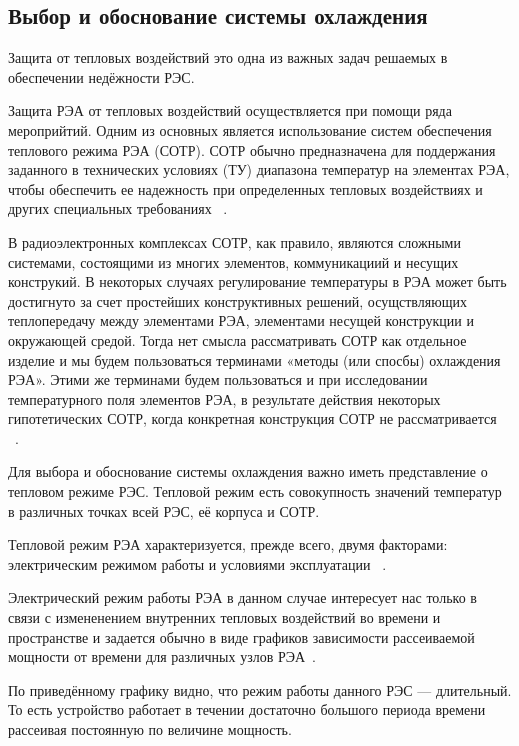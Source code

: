 \subsection{Выбор и обоснование системы охлаждения}

Защита от тепловых воздействий это одна из важных задач решаемых в обеспечении недёжности РЭС.

Защита РЭА от тепловых воздействий осуществляется при помощи ряда
мероприйтий. Одним из основных является использование систем
обеспечения теплового режима РЭА (СОТР). СОТР обычно предназначена для
поддержания заданного в технических условиях (ТУ) диапазона температур
на элементах РЭА, чтобы обеспечить ее надежность при определенных
тепловых воздействиях и других специальных требованиях ~\cite{Rotkop1976}.

В радиоэлектронных комплексах СОТР, как правило, являются сложными
системами, состоящими из многих элементов, коммуникациий и несущих
конструкий. В некоторых случаях регулирование температуры в РЭА может
быть достигнуто за счет простейших конструктивных решений,
осущствляющих теплопередачу между элементами РЭА, элементами несущей
конструкции и окружающей средой. Тогда нет смысла рассматривать СОТР
как отдельное изделие и мы будем пользоваться терминами «методы (или
спосбы) охлаждения РЭА». Этими же терминами будем пользоваться и при
исследовании температурного поля элементов РЭА, в результате действия
некоторых гипотетических СОТР, когда конкретная конструкция СОТР не
рассматривается ~\cite{Rotkop1976}.

Для выбора и обоснование системы охлаждения важно иметь представление
о тепловом режиме РЭС.  Тепловой режим есть совокупность значений
температур в различных точках всей РЭС, её корпуса и СОТР.

Тепловой режим РЭА характеризуется, прежде всего, двумя факторами:
электрическим режимом работы и условиями эксплуатации ~\cite{Rotkop1976}.

Электрический режим работы РЭА в данном случае интересует нас только в
связи с измененением внутренних тепловых воздействий во времени и
пространстве и задается обычно в виде графиков зависимости
рассеиваемой мощности от времени для различных узлов РЭА~\cite{Rotkop1976}.



По приведённому графику видно, что режим работы данного РЭС —
длительный. То есть устройство работает в течении достаточно большого
периода времени рассеивая постоянную по величине мощность.

